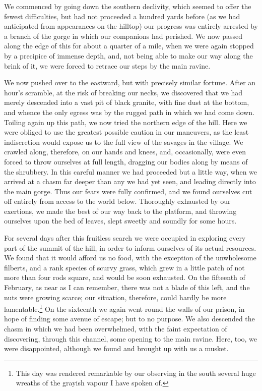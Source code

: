 We commenced by going down the southern declivity, which seemed to offer the
fewest difficulties, but had not proceeded a hundred yards before (as we had
anticipated from appearances on the hilltop) our progress was entirely arrested
by a branch of the gorge in which our companions had perished. We now passed
along the edge of this for about a quarter of a mile, when we were again stopped
by a precipice of immense depth, and, not being able to make our way along the
brink of it, we were forced to retrace our steps by the main ravine. 

We now pushed over to the eastward, but with precisely similar fortune. After
an hour's scramble, at the risk of breaking our necks, we discovered that we had
merely descended into a vast pit of black granite, with fine dust at the bottom,
and whence the only egress was by the rugged path in which we had come down.
Toiling again up this path, we now tried the northern edge of the hill. Here we
were obliged to use the greatest possible caution in our maneuvers, as the least
indiscretion would expose us to the full view of the savages in the village. We
crawled along, therefore, on our hands and knees, and, occasionally, were even
forced to throw ourselves at full length, dragging our bodies along by means of
the shrubbery. In this careful manner we had proceeded but a little way, when we
arrived at a chasm far deeper than any we had yet seen, and leading directly
into the main gorge. Thus our fears were fully confirmed, and we found ourselves
cut off entirely from access to the world below. Thoroughly exhausted by our
exertions, we made the best of our way back to the platform, and throwing
ourselves upon the bed of leaves, slept sweetly and soundly for some hours. 

For several days after this fruitless search we were occupied in exploring
every part of the summit of the hill, in order to inform ourselves of its actual
resources. We found that it would afford us no food, with the exception of the
unwholesome filberts, and a rank species of scurvy grass, which grew in a little
patch of not more than four rods square, and would be soon exhausted. On the
fifteenth of February, as near as I can remember, there was not a blade of this
left, and the nuts were growing scarce; our situation, therefore, could hardly
be more lamentable.\footnote{
This day was
rendered remarkable by our observing in the south several huge wreaths of the
grayish vapour I have spoken of.}
On the sixteenth we again went round the
walls of our prison, in hope of finding some avenue of escape; but to no
purpose. We also descended the chasm in which we had been overwhelmed, with the
faint expectation of discovering, through this channel, some opening to the main
ravine. Here, too, we were disappointed, although we found and brought up with
us a musket. 

